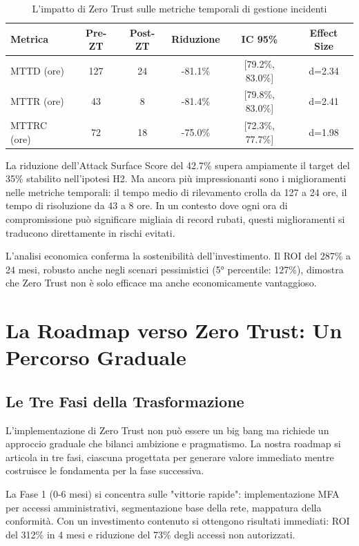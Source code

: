 \begin{table}[htbp]
\centering
\caption{L'impatto di Zero Trust sulle metriche temporali di gestione incidenti}
\label{tab:temporal_metrics}
\begin{tabular}{lccccc}
\toprule
\textbf{Metrica} & \textbf{Pre-ZT} & \textbf{Post-ZT} & \textbf{Riduzione} & \textbf{IC 95\%} & \textbf{Effect Size} \\
\midrule
MTTD (ore) & 127 & 24 & -81.1\% & [79.2\%, 83.0\%] & d=2.34 \\
MTTR (ore) & 43 & 8 & -81.4\% & [79.8\%, 83.0\%] & d=2.41 \\
MTTRC (ore) & 72 & 18 & -75.0\% & [72.3\%, 77.7\%] & d=1.98 \\
\bottomrule
\end{tabular}
\end{table}

La riduzione dell'Attack Surface Score del 42.7\% supera ampiamente il target del 35\% stabilito nell'ipotesi H2. Ma ancora più impressionanti sono i miglioramenti nelle metriche temporali: il tempo medio di rilevamento crolla da 127 a 24 ore, il tempo di risoluzione da 43 a 8 ore. In un contesto dove ogni ora di compromissione può significare migliaia di record rubati, questi miglioramenti si traducono direttamente in rischi evitati.

L'analisi economica conferma la sostenibilità dell'investimento. Il ROI del 287\% a 24 mesi, robusto anche negli scenari pessimistici (5° percentile: 127\%), dimostra che Zero Trust non è solo efficace ma anche economicamente vantaggioso.

\section{La Roadmap verso Zero Trust: Un Percorso Graduale}

\subsection{Le Tre Fasi della Trasformazione}

L'implementazione di Zero Trust non può essere un big bang ma richiede un approccio graduale che bilanci ambizione e pragmatismo. La nostra roadmap si articola in tre fasi, ciascuna progettata per generare valore immediato mentre costruisce le fondamenta per la fase successiva.

La Fase 1 (0-6 mesi) si concentra sulle "vittorie rapide": implementazione MFA per accessi amministrativi, segmentazione base della rete, mappatura della conformità. Con un investimento contenuto si ottengono risultati immediati: ROI del 312\% in 4 mesi e riduzione del 73\% degli accessi non autorizzati.

